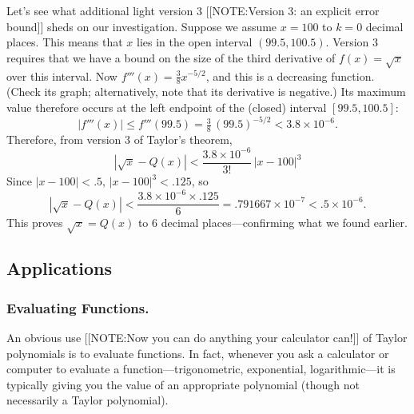 Let's see what additional light version 3 
[[NOTE:Version 3:   an explicit   error bound]]  
sheds on our investigation.  Suppose we assume $x = 100$ to $k = 0$
decimal places.  This means that $x$ lies in the open interval $(99.5,
100.5)$.  Version 3 requires that we have a bound on the size of the
third derivative of $f(x) = \sqrt{x}$ over this interval.  Now
$f'''(x) = \tfrac{3}{8} x^{-5/2}$, and this is a decreasing function.
(Check its graph; alternatively, note that its derivative is
negative.)  Its maximum value therefore occurs at the left endpoint of
the (closed) interval $[99.5, 100.5]$:
        \[
|f'''(x)| \leq f'''(99.5) = \tfrac{3}{8} \, (99.5)^{-5/2}
                < 3.8 \times 10^{-6}.
\]
Therefore, from version 3 of Taylor's theorem,
        \[
|\sqrt{x} - Q(x)| < \dfrac{3.8 \times 10^{-6}}{3!} \, |x - 100|^3
\]
Since $|x - 100| < .5$, $|x - 100|^3 < .125$, so
        \[
|\sqrt{x} - Q(x)| < \dfrac{3.8 \times 10^{-6} \times .125}{6} = 
                .791667 \times 10^{-7} < .5 \times 10^{-6}.
\]
This proves $\sqrt{x} = Q(x)$ to 6 decimal places---confirming what we
found earlier.





\subsection{Applications}
\label{subsec:applications}

\subsubsection{Evaluating Functions.}
An obvious use 
[[NOTE:Now you can do anything your calculator can!]]
of Taylor polynomials is to evaluate functions.  In fact, whenever you
ask a calculator or computer to evaluate a function---trigonometric,
exponential, logarithmic---it is typically giving you the value of an
appropriate polynomial (though not necessarily a Taylor polynomial).







